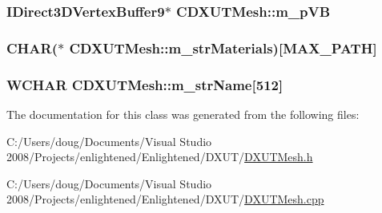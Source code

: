 \label{class_c_d_x_u_t_mesh_a916868603f58f3d35c52a788f1a7075f}
\hypertarget{class_c_d_x_u_t_mesh_adb848acc24af1a95863161a545eaa68e}{
\subsubsection[{m\_\-pVB}]{\setlength{\rightskip}{0pt plus 5cm}IDirect3DVertexBuffer9$\ast$ {\bf CDXUTMesh::m\_\-pVB}}}
\label{class_c_d_x_u_t_mesh_adb848acc24af1a95863161a545eaa68e}
\hypertarget{class_c_d_x_u_t_mesh_aeecb8deba496fe0213a2e5f5cd18f31d}{
\subsubsection[{m\_\-strMaterials}]{\setlength{\rightskip}{0pt plus 5cm}CHAR($\ast$ {\bf CDXUTMesh::m\_\-strMaterials})\mbox{[}MAX\_\-PATH\mbox{]}}}
\label{class_c_d_x_u_t_mesh_aeecb8deba496fe0213a2e5f5cd18f31d}
\hypertarget{class_c_d_x_u_t_mesh_a4b95b361c839f554ab58fc32595d1632}{
\subsubsection[{m\_\-strName}]{\setlength{\rightskip}{0pt plus 5cm}WCHAR {\bf CDXUTMesh::m\_\-strName}\mbox{[}512\mbox{]}}}
\label{class_c_d_x_u_t_mesh_a4b95b361c839f554ab58fc32595d1632}


The documentation for this class was generated from the following files:\begin{DoxyCompactItemize}
\item 
C:/Users/doug/Documents/Visual Studio 2008/Projects/enlightened/Enlightened/DXUT/\hyperlink{_d_x_u_t_mesh_8h}{DXUTMesh.h}\item 
C:/Users/doug/Documents/Visual Studio 2008/Projects/enlightened/Enlightened/DXUT/\hyperlink{_d_x_u_t_mesh_8cpp}{DXUTMesh.cpp}\end{DoxyCompactItemize}
